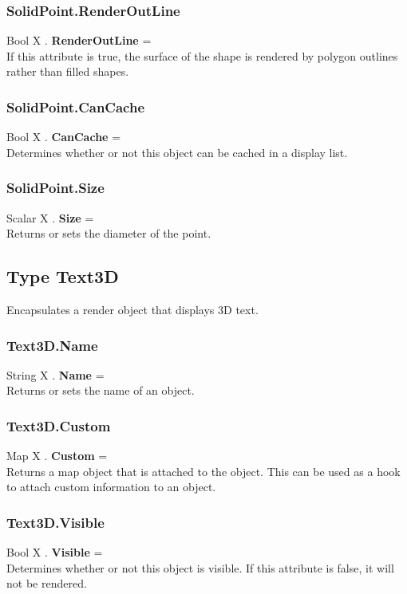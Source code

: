 \subsubsection{SolidPoint.RenderOutLine \label{F:SolidPoint:RenderOutLine}}
Bool X . \textbf{RenderOutLine} = \\
If this attribute is true, the surface of the shape is rendered by polygon outlines rather than filled shapes.

\subsubsection{SolidPoint.CanCache \label{F:SolidPoint:CanCache}}
Bool X . \textbf{CanCache} = \\
Determines whether or not this object can be cached in a display list.

\subsubsection{SolidPoint.Size \label{F:SolidPoint:Size}}
Scalar X . \textbf{Size} = \\
Returns or sets the diameter of the point.

\subsection{Type Text3D \label{T:Text3D}}
Encapsulates a render object that displays 3D text.

\subsubsection{Text3D.Name \label{F:Text3D:Name}}
String X . \textbf{Name} = \\
Returns or sets the name of an object.

\subsubsection{Text3D.Custom \label{F:Text3D:Custom}}
Map X . \textbf{Custom} = \\
Returns a map object that is attached to the object. This can be used as a hook to attach custom information to an object.


\subsubsection{Text3D.Visible \label{F:Text3D:Visible}}
Bool X . \textbf{Visible} = \\
Determines whether or not this object is visible. If this attribute is false, it will not be rendered.

